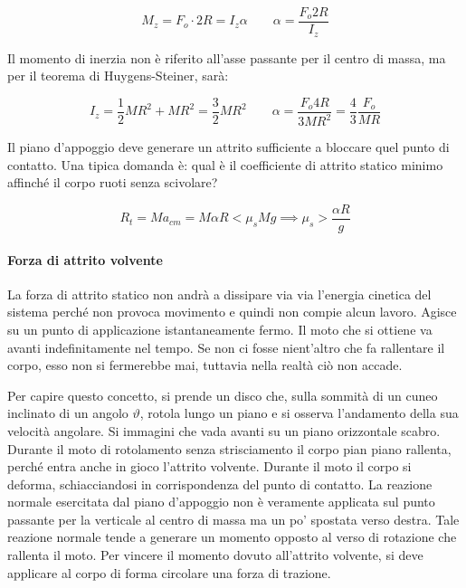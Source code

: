 \[
	M_z = F_o\cdot 2R = I_z\alpha \qquad \alpha = \frac{F_o 2 R}{I_z }
\]

Il momento di inerzia non è riferito all'asse passante per il centro di massa, ma per il teorema di Huygens-Steiner, sarà:

\[
	I_z = \frac{1}{2} MR^2 + MR^2 = \frac{3}{2} MR^2 \qquad \alpha = \frac{F_o 4 R}{3MR^2} = \frac{4}{3}\frac{F_o }{MR}
\]

Il piano d'appoggio deve generare un attrito sufficiente a bloccare quel punto di contatto. Una tipica domanda è: qual è il coefficiente di attrito statico minimo affinché il corpo ruoti senza scivolare?

\[
	R_t = Ma_{cm} = M\alpha R < \mu_s Mg \implies \mu_s>\frac{\alpha R}{g}
\]

\paragraph{Forza di attrito volvente} La forza di attrito statico non andrà a dissipare via via l'energia cinetica del sistema perché non provoca movimento e quindi non compie alcun lavoro. Agisce su un punto di applicazione istantaneamente fermo. Il moto che si ottiene va avanti indefinitamente nel tempo. Se non ci fosse nient'altro che fa rallentare il corpo, esso non si fermerebbe mai, tuttavia nella realtà ciò non accade.

Per capire questo concetto, si prende un disco che, sulla sommità di un cuneo inclinato di un angolo $\vartheta$, rotola lungo un piano e si osserva l'andamento della sua velocità angolare. Si immagini che vada avanti su un piano orizzontale scabro. Durante il moto di rotolamento senza strisciamento il corpo pian piano rallenta,  perché entra anche in gioco l'attrito volvente. Durante il moto il corpo si deforma, schiacciandosi in corrispondenza del punto di contatto. La reazione normale esercitata dal piano d'appoggio non è veramente applicata sul punto passante per la verticale al centro di massa ma un po' spostata verso destra. Tale reazione normale tende a generare un momento opposto al verso di rotazione che rallenta il moto. Per vincere il momento dovuto all'attrito volvente, si deve applicare al corpo di forma circolare una forza di trazione.

